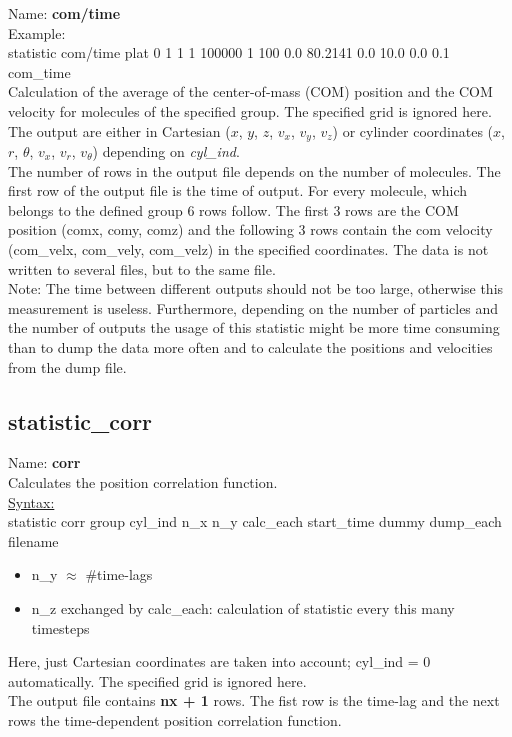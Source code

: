 Name: {\bfseries com/time}\\[2ex]
Example:\\[0.5ex]
statistic       com/time plat 0 1 1 1 100000 1 100 0.0 80.2141 0.0 10.0 0.0 0.1 com\_time
\\[2ex]
Calculation of the average of the center-of-mass (COM) position and the COM velocity for molecules of the specified group.
The specified grid is ignored here.
\\[2ex]
The output are either in Cartesian ($x$, $y$, $z$, $v_x$, $v_y$, $v_z$) or cylinder coordinates ($x$, $r$, $\theta$, $v_x$, $v_r$, $v_{\theta}$) depending on \textit{cyl\_ind}.
\\[2ex]
The number of rows in the output file depends on the number of molecules. 
The first row of the output file is the time of output.
For every molecule, which belongs to the defined group 6 rows follow.
The first 3 rows are the COM position (comx, comy, comz) and the following 3 rows contain the com velocity (com\_velx, com\_vely, com\_velz) in the specified coordinates.
The data is not written to several files, but to the same file.
\\[2ex]
Note: The time between different outputs should not be too large, otherwise this measurement is useless.
Furthermore, depending on the number of particles and the number of outputs the usage of this statistic might be more time consuming than to dump the data more often and to calculate the positions and velocities from the dump file.


\subsection{statistic\_corr}

Name: {\bfseries corr}
\\[2ex]
Calculates the position correlation function.
\\[2ex]
\underline{Syntax:}\\
statistic	corr group cyl\_ind n\_x n\_y calc\_each start\_time dummy dump\_each filename
\begin{itemize}
\item n\_y $\approx$ \#time-lags
\item n\_z exchanged by calc\_each: calculation of statistic every this many timesteps
\end{itemize} 
Here, just Cartesian coordinates are taken into account; cyl\_ind = 0 automatically.
The specified grid is ignored here.
\\[2ex]
The output file contains {\bfseries nx + 1} rows.
The fist row is the time-lag and the next rows the time-dependent position correlation function.


